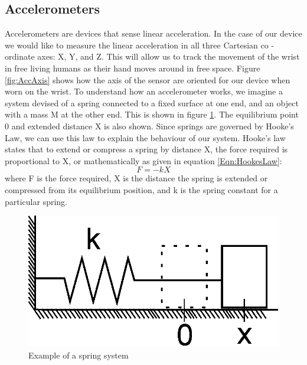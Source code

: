 \subsection{Accelerometers}
\label{Sec:Accelerometer}
Accelerometers are devices that sense linear acceleration.
In the case of our device we would like to measure the linear acceleration in all three Cartesian co - ordinate axes: X, Y, and Z.
This will allow us to track the movement of the wrist in free living humans as their hand moves around in free space.
Figure \ref{fig:AccAxis} shows how the axis of the sensor are oriented for our device when worn on the wrist.
To understand how an accelerometer works,
we imagine a system devised of a spring connected to a fixed surface at one end,
and an object with a mass M at the other end. This is shown in figure \ref{fig:HookeSpring}.
The equilibrium point 0 and extended distance X is also shown.
Since springs are governed by Hooke's Law, we can use this law to explain the behaviour of our system.
Hooke's law states that to extend or compress a spring by distance X,
the force required is proportional to X, or mathematically as given in equation \ref{Eqn:HookesLaw}:
\begin{equation}
\label{Eqn:HookesLaw}
F = -kX 
\end{equation}
where F is the force required, X is the distance the spring is extended or compressed from its equilibrium position, and k is the spring constant for a particular spring.
\begin{figure}
\begin{center}
\includegraphics{images/HookesLaw.eps}
\caption{Example of a spring system}
\label{fig:HookeSpring}
\end{center}
\end{figure}

